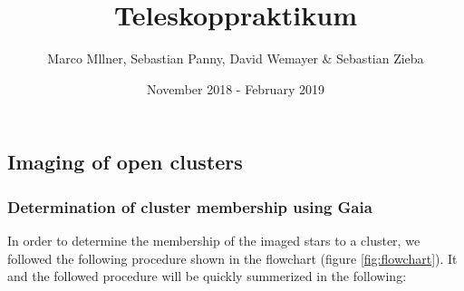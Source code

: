 \documentclass{article}
\title{Teleskoppraktikum}
\author{Marco Mllner, Sebastian Panny, David Wemayer \& Sebastian Zieba}
\date{November 2018 - February 2019}
\begin{document}
\maketitle


\begin{abstract}

\end{abstract}

\newpage
\tableofcontents
\newpage




\subsection{Imaging of open clusters}


\subsubsection{Determination of cluster membership using Gaia} %
\label{sec:CMs}

In order to determine the membership of the imaged stars to a cluster, we followed the following procedure shown in the flowchart (figure \ref{fig:flowchart}). It and the followed procedure will be quickly summerized in the following:
\end{document}
